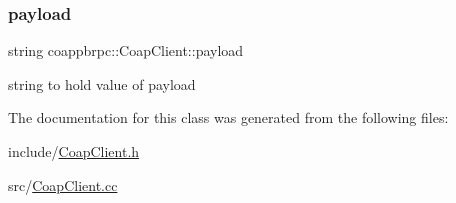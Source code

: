 \subsubsection{\texorpdfstring{payload}{payload}}
{\footnotesize\ttfamily string coappbrpc\+::\+Coap\+Client\+::payload}

string to hold value of payload 

The documentation for this class was generated from the following files\+:\begin{DoxyCompactItemize}
\item 
include/\hyperlink{CoapClient_8h}{Coap\+Client.\+h}\item 
src/\hyperlink{CoapClient_8cc}{Coap\+Client.\+cc}\end{DoxyCompactItemize}
